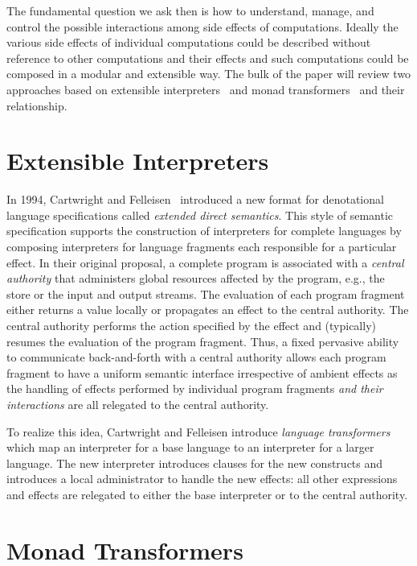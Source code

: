 \documentclass{llncs}
\begin{document}
The fundamental question we ask then is how to understand, manage, and
control the possible interactions among side effects of computations.
Ideally the various side effects of individual computations could be
described without reference to other computations and their effects
and such computations could be composed in a modular and extensible
way. The bulk of the paper will review two approaches based on
extensible interpreters~\cite{cartwright-extensible} and monad
transformers~\cite{liang-interpreter} and their relationship.

\section{Extensible Interpreters}

In 1994, Cartwright and Felleisen~\cite{cartwright-extensible}
introduced a new format for denotational language specifications
called \emph{extended direct semantics}. This style of semantic
specification supports the construction of interpreters for complete
languages by composing interpreters for language fragments each
responsible for a particular effect. In their original proposal, a
complete program is associated with a \emph{central authority} that
administers global resources affected by the program, e.g., the store
or the input and output streams. The evaluation of each program
fragment either returns a value locally or propagates an effect to the
central authority. The central authority performs the action specified
by the effect and (typically) resumes the evaluation of the program
fragment. Thus, a fixed pervasive ability to communicate
back-and-forth with a central authority allows each program fragment
to have a uniform semantic interface irrespective of ambient effects
as the handling of effects performed by individual program fragments
\emph{and their interactions} are all relegated to the central
authority.

To realize this idea, Cartwright and Felleisen introduce
\emph{language transformers} which map an interpreter for a base
language to an interpreter for a larger language. The new interpreter
introduces clauses for the new constructs and introduces a local
administrator to handle the new effects: all other expressions and
effects are relegated to either the base interpreter or to the central
authority.


\section{Monad Transformers}
\end{document}
